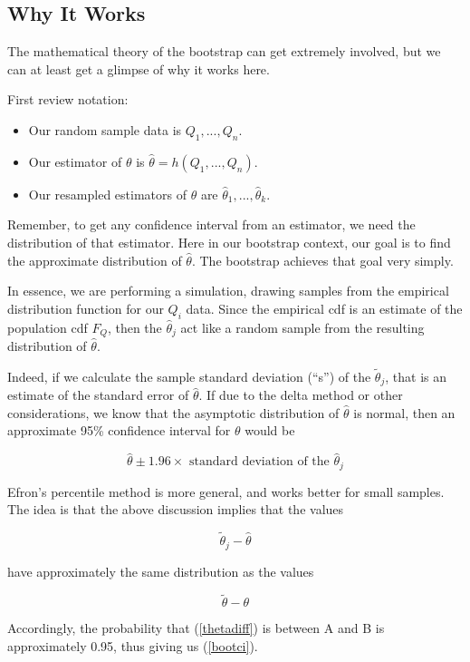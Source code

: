 \subsection{Why It Works}

The mathematical theory of the bootstrap can get extremely involved, but
we can at least get a glimpse of why it works here.

First review notation:

\begin{itemize}

\item Our random sample data is $Q_1,...,Q_n$.

\item Our estimator of $\theta$ is $\widehat{\theta} = h(Q_1,...,Q_n)$.

\item Our resampled estimators of $\theta$ are $\widehat{\theta}_1,...,
\widehat{\theta}_k$.

\end{itemize}

Remember, to get any confidence interval from an estimator, we need the
distribution of that estimator.  Here in our bootstrap context, our goal
is to find the approximate distribution of $\widehat{\theta}$.  The
bootstrap achieves that goal very simply.

In essence, we are performing a simulation, drawing samples from the
empirical distribution function for our $Q_i$ data.  Since the empirical
cdf is an estimate of the population cdf $F_Q$, then the
$\widehat{\theta}_j$ act like a random sample from the resulting
distribution of $\widehat{\theta}$.

Indeed, if we calculate the sample standard deviation (``s'') of the
$\widetilde{\theta}_j$, that is an estimate of the standard error of
$\widehat{\theta}$.  If due to the delta method or other
considerations, we know that the asymptotic distribution of
$\widehat{\theta}$ is normal, then an approximate 95\% confidence
interval for $\theta$ would be

\begin{equation}
\widehat{\theta} \pm 1.96 \times 
\textrm{ standard deviation of the } \widehat{\theta}_j
\end{equation}

Efron's percentile method is more general, and works better for small
samples.  The idea is that the above discussion implies that the values

\begin{equation}
\widetilde{\theta}_j - \widehat{\theta}
\end{equation}

have approximately the same distribution as the values

\begin{equation}
\label{thetadiff}
\widetilde{\theta} - \theta
\end{equation}

Accordingly, the probability that (\ref{thetadiff}) is between A and B
is approximately 0.95, thus giving us (\ref{bootci}).


